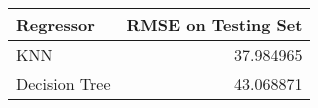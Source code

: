 \begin{tabular}{lr}
\toprule
     Regressor &  RMSE on Testing Set \\
\midrule
           KNN &            37.984965 \\
 Decision Tree &            43.068871 \\
\bottomrule
\end{tabular}

